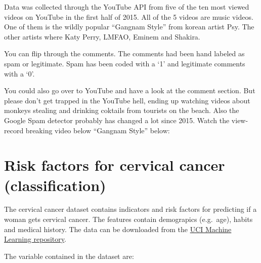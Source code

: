 \documentclass[12pt,]{krantz}
\theoremstyle{definition}
\theoremstyle{definition}
\theoremstyle{definition}
\theoremstyle{remark}
\begin{document}
Data was collected through the YouTube API from five of the ten most
viewed videos on YouTube in the first half of 2015. All of the 5 videos
are music videos. One of them is the wildly popular ``Gangnam Style''
from korean artist Psy. The other artists where Katy Perry, LMFAO,
Eminem and Shakira.

You can flip through the comments. The comments had been hand labeled as
spam or legitimate. Spam has been coded with a `1' and legitimate
comments with a `0'.

\hypertarget{htmlwidget-acfbc291d93045d4b13d}{}

You could also go over to YouTube and have a look at the comment
section. But please don't get trapped in the YouTube hell, ending up
watching videos about monkeys stealing and drinking coktails from
tourists on the beach. Also the Google Spam detector probably has
changed a lot since 2015. Watch the view-record breaking video below
``Gangnam Style'' below:

\section{Risk factors for cervical cancer
(classification)}\label{cervical.data}

The cervical cancer dataset contains indicators and risk factors for
predicting if a woman gets cervical cancer. The features contain
demograpics (e.g.~age), habits and medical history. The data can be
downloaded from the
\href{https://archive.ics.uci.edu/ml/datasets/Cervical+cancer+\%28Risk+Factors\%29}{UCI
Machine Learning repository}.

The variable contained in the dataset are:
\end{document}
